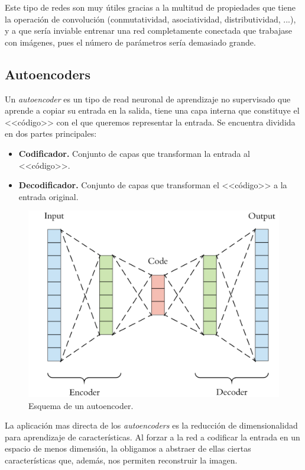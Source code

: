 \documentclass[
  a4paper,
  12pt,
  spanish,
]{scrartcl}
\theoremstyle{teorema-style}
\begin{document}
Este tipo de redes son muy útiles gracias a la multitud de propiedades que tiene la operación de convolución (conmutatividad, asociatividad, distributividad, ...), y a que sería inviable entrenar una red completamente conectada que trabajase con imágenes, pues el número de parámetros sería demasiado grande.

\subsection{Autoencoders}

Un \textit{autoencoder} es un tipo de read neuronal de aprendizaje no supervisado que aprende a copiar su entrada en la
salida, tiene una capa interna que constituye el <<código>> con
el que queremos representar la entrada. Se encuentra dividida en dos partes principales:
\begin{itemize}
  \item \textbf{Codificador.} Conjunto de capas que transforman la entrada al <<código>>.
  \item \textbf{Decodificador.} Conjunto de capas que transforman el <<código>> a la entrada original.
\end{itemize}

\begin{figure}[h]
  \centering
  \includegraphics[width=.8\textwidth]{img/autoencoder}
  \caption{Esquema de un autoencoder.}
  \label{fig:autoencoder}
\end{figure}

La aplicación mas directa de los \textit{autoencoders} es la reducción de
dimensionalidad para aprendizaje de características. Al forzar a la red a
codificar la entrada en un espacio de menos dimensión, la obligamos a abstraer
de ellas ciertas características que, además, nos permiten reconstruir la
imagen.
\end{document}
